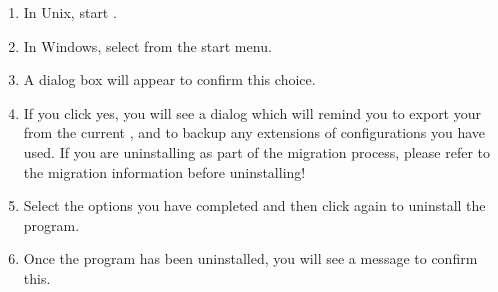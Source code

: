 
\begin{enumerate}

\item In Unix, start .  
\item In Windows, select  from the  start menu. 

 
\item A dialog box will appear to confirm this choice. 
\item If you click yes, you will see a dialog which will remind you to export your \gdprojects{} from the current \gddb{}, and to backup any extensions of configurations you have used.
If you are uninstalling as part of the migration process, please refer to the migration information  before uninstalling!
\item Select the options you have completed and then click   again to uninstall the program. 
\item Once the program has been uninstalled, you will see a  message to confirm this.  
\end{enumerate}
